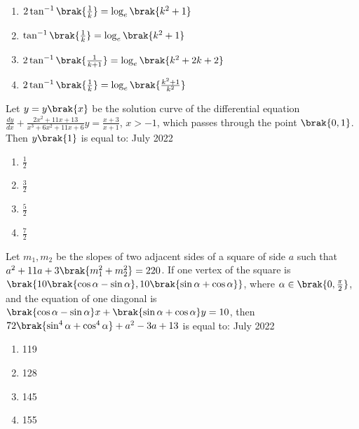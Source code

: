         \begin{enumerate}
        \item $2\tan^{-1}\brak{\frac{1}{k}}=\log_{e}\brak{k^{2}+1}$
        \item $\tan^{-1}\brak{\frac{1}{k}}=\log_{e}\brak{k^{2}+1}$
        \item $2\tan^{-1}\brak{\frac{1}{k+1}}=\log_{e}\brak{k^{2}+2k+2}$
        \item $2\tan^{-1}\brak{\frac{1}{k}}=\log_{e}\brak{\frac{k^{2}+1}{k^{2}}}$
        \end{enumerate}

    \item Let $y=y\brak{x}$ be the solution curve of the differential equation $\frac{dy}{dx}+\frac{2x^{2}+11x+13}{x^{3}+6x^{2}+11x+6}y=\frac{x+3}{x+1}$, $x>-1$, which passes through the point $\brak{0,1}$. Then $y\brak{1}$ is equal to: \hfill{July 2022}

        \begin{multicols}{4}
        \begin{enumerate}
        \item $\frac{1}{2}$
        \item $\frac{3}{2}$
        \item $\frac{5}{2}$
        \item $\frac{7}{2}$
        \end{enumerate}
        \end{multicols}

    \item Let $m_{1}, m_{2}$ be the slopes of two adjacent sides of a square of side $a$ such that $a^{2}+11a+3\brak{m_{1}^{2}+m_{2}^{2}}=220$. If one vertex of the square is $\brak{10\brak{\cos{\alpha}-\sin{\alpha}}, 10\brak{\sin{\alpha}+\cos{\alpha}}}$, where $\alpha\in\brak{0,\frac{\pi}{2}}$, and the equation of one diagonal is $\brak{\cos{\alpha}-\sin{\alpha}}x+\brak{\sin{\alpha}+\cos{\alpha}}y=10$, then $72\brak{\sin^{4}{\alpha}+\cos^{4}{\alpha}}+a^{2}-3a+13$ is equal to: \hfill{July 2022}

        \begin{multicols}{4}
        \begin{enumerate}
        \item 119
        \item 128
        \item 145
        \item 155
        \end{enumerate}
        \end{multicols}

